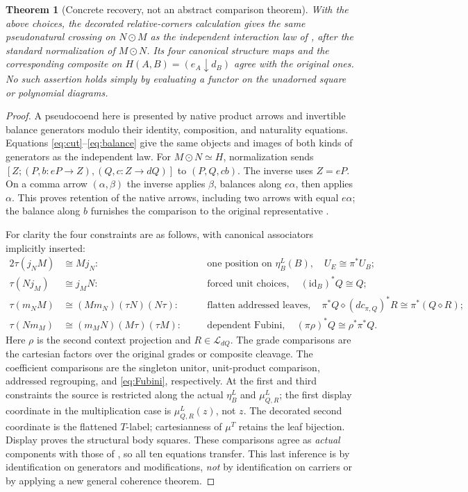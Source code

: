 \documentclass[11pt]{article}
\newtheorem{theorem}{Theorem}[section]
\theoremstyle{definition}
\newcommand{\Lcat}{\mathcal L}
\newcommand{\id}{\mathrm{id}}
\begin{document}
\begin{theorem}[Concrete recovery, not an abstract comparison theorem]
\label{th:assembly}
With the above choices, the decorated relative-corners calculation gives
the same pseudonatural crossing on $N\odot M$ as the independent
interaction law of \cite{O1}, after the standard normalization of
$M\odot N$. Its four canonical structure maps and the corresponding
composite on $H(A,B)=(e_A\downarrow d_B)$ agree with the original
ones. No such assertion holds simply by evaluating a functor on the
unadorned square or polynomial diagrams.
\end{theorem}
\begin{proof}
A pseudocoend here is presented by native product arrows and invertible
balance generators modulo their identity, composition, and naturality
equations. Equations \eqref{eq:cut}--\eqref{eq:balance} give the same
objects and images of both kinds of generators as the independent law.
For $M\odot N\simeq H$, normalization sends
$[Z;(P,b:eP\to Z),(Q,c:Z\to dQ)]$ to $(P,Q,cb)$. The inverse
uses $Z=eP$. On a comma arrow $(\alpha,\beta)$ the inverse applies
$\beta$, balances along $e\alpha$, then applies $\alpha$.
This proves retention of the native arrows, including two arrows with
equal $e\alpha$; the balance along $b$ furnishes the comparison to
the original representative \cite[section on pseudocoend normalization]{U}.

For clarity the four constraints are as follows, with canonical
associators implicitly inserted:
\begin{alignat*}{2}
 \tau(j_NM)&\cong Mj_N:
 &\quad &\text{one position on }\eta^L_B(B),\quad U_E\cong\pi^*U_B;\\
 \tau(Nj_M)&\cong j_MN:
 &&\text{forced unit choices},\quad (\id_B)^*Q\cong Q;\\
 \tau(m_N M)&\cong (M m_N)(\tau N)(N\tau):
 &&\text{flatten addressed leaves},\quad
    \pi^*Q\diamond (dc_{\pi,Q})^*R\cong\pi^*(Q\diamond R);\\
 \tau(N m_M)&\cong (m_M N)(M\tau)(\tau M):
 &&\text{dependent Fubini},\quad
             (\pi\rho)^*Q\cong\rho^*\pi^*Q .
\end{alignat*}
Here $\rho$ is the second context projection and $R\in\Lcat_{dQ}$.
The grade comparisons are the cartesian factors over the original
grades or composite cleavage. The coefficient comparisons are the
singleton unitor, unit-product comparison, addressed regrouping, and
\eqref{eq:Fubini}, respectively. At the first and third constraints the
source is restricted along the actual $\eta^L_B$ and $\mu^L_{Q,R}$;
the first display coordinate in the multiplication case is
$\mu^L_{Q,R}(z)$, not $z$. The decorated second coordinate is the
flattened $T$-label; cartesianness of $\mu^T$ retains the leaf bijection.
Display proves the structural body squares. These comparisons agree as
\emph{actual} components with those of \cite[construction of the full
interaction]{O1}, so all ten equations transfer. This last inference is
by identification on generators and modifications, \emph{not} by
identification on carriers or by applying a new general coherence theorem.


\end{proof}
\end{document}

